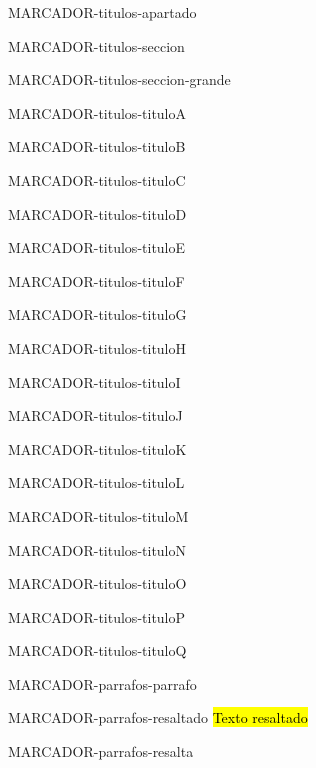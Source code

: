 \documentclass[11pt,a4paper]{extarticle}
\begin{document}
\newpage
{\color{white}\tiny MARCADOR-titulos-apartado}

\newpage
{\color{white}\tiny MARCADOR-titulos-seccion}

\newpage
{\color{white}\tiny MARCADOR-titulos-seccion-grande}

\newpage
{\color{white}\tiny MARCADOR-titulos-tituloA}

\newpage
{\color{white}\tiny MARCADOR-titulos-tituloB}

\newpage
{\color{white}\tiny MARCADOR-titulos-tituloC}

\newpage
{\color{white}\tiny MARCADOR-titulos-tituloD}

\newpage
{\color{white}\tiny MARCADOR-titulos-tituloE}

\newpage
{\color{white}\tiny MARCADOR-titulos-tituloF}

\newpage
{\color{white}\tiny MARCADOR-titulos-tituloG}

\newpage
{\color{white}\tiny MARCADOR-titulos-tituloH}

\newpage
{\color{white}\tiny MARCADOR-titulos-tituloI}

\newpage
{\color{white}\tiny MARCADOR-titulos-tituloJ}

\newpage
{\color{white}\tiny MARCADOR-titulos-tituloK}

\newpage
{\color{white}\tiny MARCADOR-titulos-tituloL}

\newpage
{\color{white}\tiny MARCADOR-titulos-tituloM}

\newpage
{\color{white}\tiny MARCADOR-titulos-tituloN}

\newpage
{\color{white}\tiny MARCADOR-titulos-tituloO}

\newpage
{\color{white}\tiny MARCADOR-titulos-tituloP}

\newpage
{\color{white}\tiny MARCADOR-titulos-tituloQ}

\newpage
{\color{white}\tiny MARCADOR-parrafos-parrafo}

\newpage
{\color{white}\tiny MARCADOR-parrafos-resaltado}
\hl{Texto resaltado}

\newpage
{\color{white}\tiny MARCADOR-parrafos-resalta}
\end{document}

